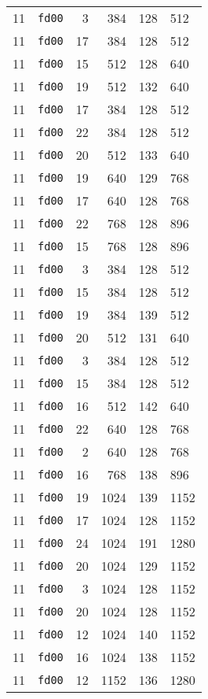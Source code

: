 \documentclass{article}
\begin{document}
\begin{table}[h!]
\begin{tabular}{llrrrl}
    11 & \texttt{fd00} & 3 & 384 & 128 & 512 \\
    11 & \texttt{fd00} & 17 & 384 & 128 & 512 \\
    11 & \texttt{fd00} & 15 & 512 & 128 & 640 \\
    11 & \texttt{fd00} & 19 & 512 & 132 & 640 \\
    11 & \texttt{fd00} & 17 & 384 & 128 & 512 \\
    11 & \texttt{fd00} & 22 & 384 & 128 & 512 \\
    11 & \texttt{fd00} & 20 & 512 & 133 & 640 \\
    11 & \texttt{fd00} & 19 & 640 & 129 & 768 \\
    11 & \texttt{fd00} & 17 & 640 & 128 & 768 \\
    11 & \texttt{fd00} & 22 & 768 & 128 & 896 \\
    11 & \texttt{fd00} & 15 & 768 & 128 & 896 \\
    11 & \texttt{fd00} & 3 & 384 & 128 & 512 \\
    11 & \texttt{fd00} & 15 & 384 & 128 & 512 \\
    11 & \texttt{fd00} & 19 & 384 & 139 & 512 \\
    11 & \texttt{fd00} & 20 & 512 & 131 & 640 \\
    11 & \texttt{fd00} & 3 & 384 & 128 & 512 \\
    11 & \texttt{fd00} & 15 & 384 & 128 & 512 \\
    11 & \texttt{fd00} & 16 & 512 & 142 & 640 \\
    11 & \texttt{fd00} & 22 & 640 & 128 & 768 \\
    11 & \texttt{fd00} & 2 & 640 & 128 & 768 \\
    11 & \texttt{fd00} & 16 & 768 & 138 & 896 \\
    11 & \texttt{fd00} & 19 & 1024 & 139 & 1152 \\
    11 & \texttt{fd00} & 17 & 1024 & 128 & 1152 \\
    11 & \texttt{fd00} & 24 & 1024 & 191 & 1280 \\
    11 & \texttt{fd00} & 20 & 1024 & 129 & 1152 \\
    11 & \texttt{fd00} & 3 & 1024 & 128 & 1152 \\
    11 & \texttt{fd00} & 20 & 1024 & 128 & 1152 \\
    11 & \texttt{fd00} & 12 & 1024 & 140 & 1152 \\
    11 & \texttt{fd00} & 16 & 1024 & 138 & 1152 \\
    11 & \texttt{fd00} & 12 & 1152 & 136 & 1280 \\

\end{tabular}
\end{table}
\end{document}
